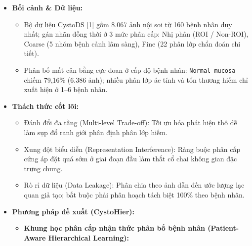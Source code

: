 \documentclass[
  10pt,
  a4paper,
  twocolumn]{article}
\providecommand{\tightlist}{%
  \setlength{\itemsep}{0pt}\setlength{\parskip}{0pt}}
\begin{document}
\begin{itemize}
\tightlist
\item
  \textbf{Bối cảnh \& Dữ liệu:}

  \begin{itemize}
  \tightlist
  \item
    Bộ dữ liệu CystoDS {[}1{]} gồm 8.067 ảnh nội soi từ 160 bệnh nhân
    duy nhất; gán nhãn đồng thời ở 3 mức phân cấp: Nhị phân (ROI /
    Non-ROI), Coarse (5 nhóm bệnh cảnh lâm sàng), Fine (22 phân lớp chẩn
    đoán chi tiết).
  \item
    Phân bố mất cân bằng cực đoan ở cấp độ bệnh nhân:
    \texttt{Normal\ mucosa} chiếm 79,16\% (6.386 ảnh); nhiều phân lớp ác
    tính và tổn thương hiếm chỉ xuất hiện ở 1--6 bệnh nhân.
  \end{itemize}
\item
  \textbf{Thách thức cốt lõi:}

  \begin{itemize}
  \tightlist
  \item
    Đánh đổi đa tầng (Multi-level Trade-off): Tối ưu hóa phát hiện thô
    dễ làm sụp đổ ranh giới phân định phân lớp hiếm.
  \item
    Xung đột biểu diễn (Representation Interference): Ràng buộc phân cấp
    cứng áp đặt quá sớm ở giai đoạn đầu làm thắt cổ chai không gian đặc
    trưng chung.
  \item
    Rò rỉ dữ liệu (Data Leakage): Phân chia theo ảnh dẫn đến ước lượng
    lạc quan giả tạo; bắt buộc phải phân hoạch tách biệt 100\% theo bệnh
    nhân.
  \end{itemize}
\item
  \textbf{Phương pháp đề xuất (CystoHier):}

  \begin{itemize}
  \tightlist
  \item
    \textbf{Khung học phân cấp nhận thức phân bố bệnh nhân
    (Patient-Aware Hierarchical Learning):}


\end{itemize}
\end{itemize}
\end{document}
